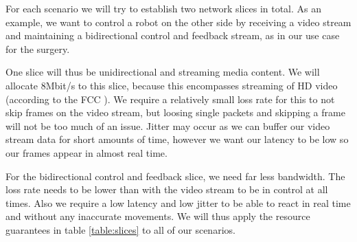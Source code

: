 


For each scenario we will try to establish two network slices in total. As an example, we want to control a robot on the other side by receiving a video stream and maintaining a bidirectional control and feedback stream, as in our use case for the surgery.

One slice will thus be unidirectional and streaming media content. We will allocate 8Mbit/s to this slice, because this encompasses streaming of HD video (according to the FCC \cite{fcc}). We require a relatively small loss rate for this to not skip frames on the video stream, but loosing single packets and skipping a frame will not be too much of an issue. Jitter may occur as we can buffer our video stream data for short amounts of time, however we want our latency to be low so our frames appear in almost real time.

For the bidirectional control and feedback slice, we need far less bandwidth. The loss rate needs to be lower than with the video stream to be in control at all times. Also we require a low latency and low jitter to be able to react in real time and without any inaccurate movements. We will thus apply the resource guarantees in table \ref{table:slices} to all of our scenarios.

